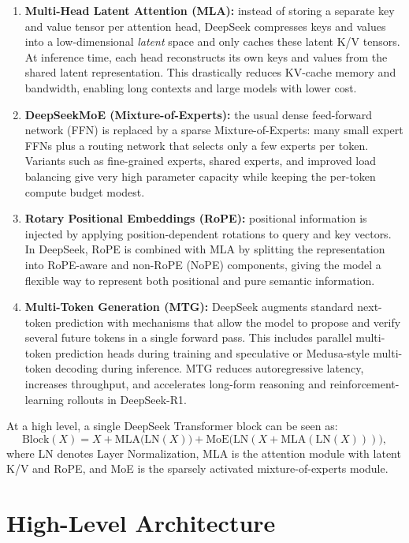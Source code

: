 \documentclass[11pt]{article}
\theoremstyle{remark}
\newcommand{\highlight}[1]{\colorbox{yellow!40}{#1}}
\begin{document}
\begin{enumerate}[label=\arabic*)]
  \item \textbf{Multi-Head Latent Attention (MLA):} instead of storing a separate key and value tensor per attention head, DeepSeek compresses keys and values into a low-dimensional \emph{latent} space and only caches these latent K/V tensors. At inference time, each head reconstructs its own keys and values from the shared latent representation. This drastically reduces KV-cache memory and bandwidth, enabling long contexts and large models with lower cost.

  \item \textbf{DeepSeekMoE (Mixture-of-Experts):} the usual dense feed-forward network (FFN) is replaced by a sparse Mixture-of-Experts: many small expert FFNs plus a routing network that selects only a few experts per token. Variants such as fine-grained experts, shared experts, and improved load balancing give very high parameter capacity while keeping the per-token compute budget modest.

  \item \textbf{Rotary Positional Embeddings (RoPE):} positional information is injected by applying position-dependent rotations to query and key vectors. In DeepSeek, RoPE is combined with MLA by splitting the representation into RoPE-aware and non-RoPE (NoPE) components, giving the model a flexible way to represent both positional and pure semantic information.

    \item \textbf{Multi-Token Generation (MTG):} DeepSeek augments standard next-token prediction with mechanisms that allow the model to propose and verify several future tokens in a single forward pass. This includes parallel multi-token prediction heads during training and speculative or Medusa-style multi-token decoding during inference. MTG reduces autoregressive latency, increases throughput, and accelerates long-form reasoning and reinforcement-learning rollouts in DeepSeek-R1.
\end{enumerate}

At a high level, a single DeepSeek Transformer block can be seen as:
\[
\text{Block}(X) = X + \text{MLA}\big(\text{LN}(X)\big)
                 + \text{MoE}\big(\text{LN}(X + \text{MLA}(\text{LN}(X)))\big),
\]
where \highlight{LN denotes Layer Normalization, MLA is the attention module with latent K/V and RoPE}, and \highlight{MoE is the sparsely activated mixture-of-experts module}.


\section{High-Level Architecture}
\end{document}
